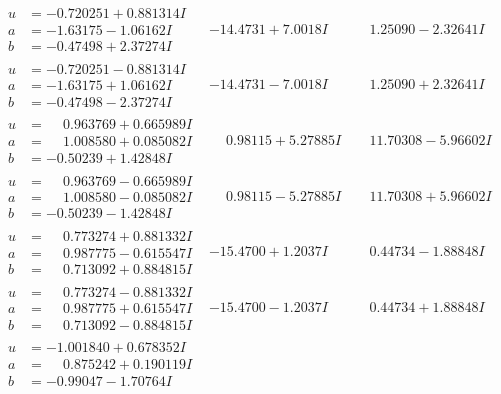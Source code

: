 \documentclass[1p]{elsarticle_modified}
\theoremstyle{definition}
\begin{document}
$$\begin{array}{c|c|c}
\begin{aligned}
u &= -0.720251 + 0.881314 I \\
a &= -1.63175 - 1.06162 I \\
b &= -0.47498 + 2.37274 I\end{aligned}
 & -14.4731 + 7.0018 I & \phantom{-}1.25090 - 2.32641 I \\ \hline\begin{aligned}
u &= -0.720251 - 0.881314 I \\
a &= -1.63175 + 1.06162 I \\
b &= -0.47498 - 2.37274 I\end{aligned}
 & -14.4731 - 7.0018 I & \phantom{-}1.25090 + 2.32641 I \\ \hline\begin{aligned}
u &= \phantom{-}0.963769 + 0.665989 I \\
a &= \phantom{-}1.008580 + 0.085082 I \\
b &= -0.50239 + 1.42848 I\end{aligned}
 & \phantom{-}0.98115 + 5.27885 I & \phantom{-}11.70308 - 5.96602 I \\ \hline\begin{aligned}
u &= \phantom{-}0.963769 - 0.665989 I \\
a &= \phantom{-}1.008580 - 0.085082 I \\
b &= -0.50239 - 1.42848 I\end{aligned}
 & \phantom{-}0.98115 - 5.27885 I & \phantom{-}11.70308 + 5.96602 I \\ \hline\begin{aligned}
u &= \phantom{-}0.773274 + 0.881332 I \\
a &= \phantom{-}0.987775 - 0.615547 I \\
b &= \phantom{-}0.713092 + 0.884815 I\end{aligned}
 & -15.4700 + 1.2037 I & \phantom{-}0.44734 - 1.88848 I \\ \hline\begin{aligned}
u &= \phantom{-}0.773274 - 0.881332 I \\
a &= \phantom{-}0.987775 + 0.615547 I \\
b &= \phantom{-}0.713092 - 0.884815 I\end{aligned}
 & -15.4700 - 1.2037 I & \phantom{-}0.44734 + 1.88848 I \\ \hline\begin{aligned}
u &= -1.001840 + 0.678352 I \\
a &= \phantom{-}0.875242 + 0.190119 I \\
b &= -0.99047 - 1.70764 I\end{aligned}

\end{array}$$
\end{document}
